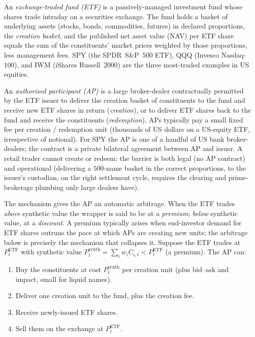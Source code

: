 \begin{definition}
\label{def:etf}
An \emph{exchange-traded fund (ETF)} is a passively-managed
investment fund whose shares trade intraday on a securities
exchange. The fund holds a basket of underlying assets (stocks,
bonds, commodities, futures) in declared proportions, the
\emph{creation basket}, and the published net asset value (NAV)
per ETF share equals the sum of the constituents' market prices
weighted by those proportions, less management fees. SPY (the
SPDR~S\&P~$500$ ETF), QQQ (Invesco Nasdaq-$100$), and IWM
(iShares Russell~$2000$) are the three most-traded examples in
US equities.
\end{definition}

\begin{definition}
\label{def:ap}
An \emph{authorised participant (AP)} is a large broker-dealer
contractually permitted by the ETF issuer to deliver the creation
basket of constituents to the fund and receive new ETF shares in
return (\emph{creation}), or to deliver ETF shares back to the
fund and receive the constituents (\emph{redemption}). APs
typically pay a small fixed fee per creation / redemption unit
(thousands of US dollars on a US-equity ETF, irrespective of
notional). For SPY the AP is one of a handful of US bank
broker-dealers; the contract is a private bilateral agreement
between AP and issuer. A retail trader cannot create or redeem:
the barrier is both legal (no AP contract) and operational
(delivering a $500$-name basket in the correct proportions, to
the issuer's custodian, on the right settlement cycle, requires
the clearing and prime-brokerage plumbing only large dealers
have).
\end{definition}

The mechanism gives the AP an automatic arbitrage. When the ETF
trades \emph{above} synthetic value the wrapper is said to be at
a \emph{premium}; \emph{below} synthetic value, at a
\emph{discount}. A premium typically arises when end-investor
demand for ETF shares outruns the pace at which APs are creating
new units; the arbitrage below is precisely the mechanism that
collapses it. Suppose the ETF trades at $P^{\text{ETF}}_t$ with
synthetic value
$P^{\text{synth}}_t = \sum_i w_i C_{i,t} < P^{\text{ETF}}_t$
(a premium). The AP can:

\begin{enumerate}
  \item Buy the constituents at cost $P^{\text{synth}}_t$ per
  creation unit (plus bid--ask and impact, small for liquid names).
  \item Deliver one creation unit to the fund, plus the creation fee.
  \item Receive newly-issued ETF shares.
  \item Sell them on the exchange at $P^{\text{ETF}}_t$.
\end{enumerate}

